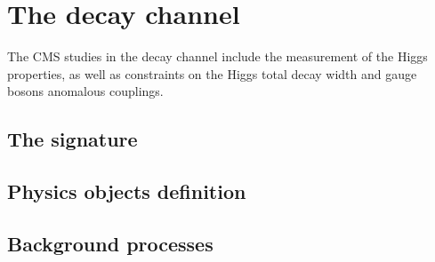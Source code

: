 \section{The \hww decay channel}
\label{sec:HWWchannel}

The CMS studies in the \hwwllnn decay channel include the measurement
of the Higgs properties, as well as constraints on the Higgs total decay width and gauge
bosons anomalous couplings.


\subsection{The \hwwllnn signature}


\subsection{Physics objects definition}


\subsection{Background processes}

